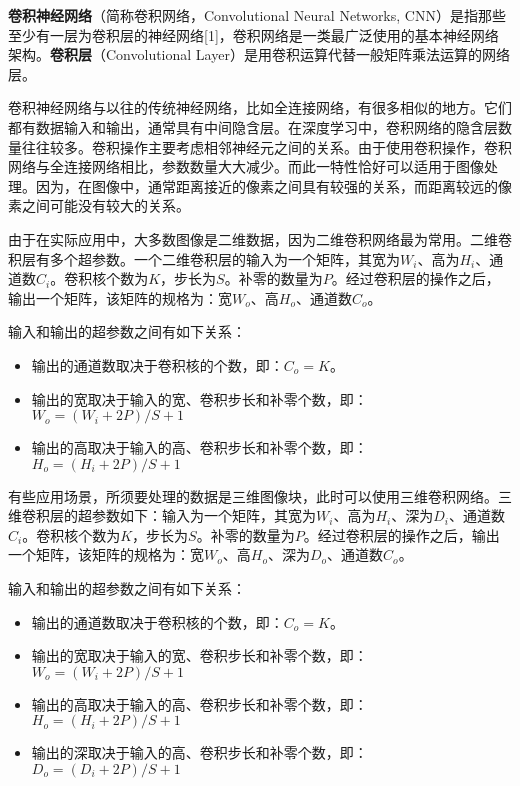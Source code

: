 

\textbf{卷积神经网络}（简称卷积网络，Convolutional Neural Networks, CNN）是指那些至少有一层为卷积层的神经网络[1]，卷积网络是一类最广泛使用的基本神经网络架构。\textbf{卷积层}（Convolutional Layer）是用卷积运算代替一般矩阵乘法运算的网络层。

卷积神经网络与以往的传统神经网络，比如全连接网络，有很多相似的地方。它们都有数据输入和输出，通常具有中间隐含层。在深度学习中，卷积网络的隐含层数量往往较多。卷积操作主要考虑相邻神经元之间的关系。由于使用卷积操作，卷积网络与全连接网络相比，参数数量大大减少。而此一特性恰好可以适用于图像处理。因为，在图像中，通常距离接近的像素之间具有较强的关系，而距离较远的像素之间可能没有较大的关系。

由于在实际应用中，大多数图像是二维数据，因为二维卷积网络最为常用。二维卷积层有多个超参数。一个二维卷积层的输入为一个矩阵，其宽为$W_i$、高为$H_i$、通道数$C_i$。卷积核个数为$K$，步长为$S$。补零的数量为$P$。经过卷积层的操作之后，输出一个矩阵，该矩阵的规格为：宽$W_o$、高$H_o$、通道数$C_o$。

输入和输出的超参数之间有如下关系： \\
\begin{itemize}
\item 输出的通道数取决于卷积核的个数，即：$C_o=K$。
\item 输出的宽取决于输入的宽、卷积步长和补零个数，即：$W_o=(W_i+2P)/S+1$
\item 输出的高取决于输入的高、卷积步长和补零个数，即：$H_o=(H_i+2P)/S+1$
\end{itemize}

有些应用场景，所须要处理的数据是三维图像块，此时可以使用三维卷积网络。三维卷积层的超参数如下：输入为一个矩阵，其宽为$W_i$、高为$H_i$、深为$D_i$、通道数$C_i$。卷积核个数为$K$，步长为$S$。补零的数量为$P$。经过卷积层的操作之后，输出一个矩阵，该矩阵的规格为：宽$W_o$、高$H_o$、深为$D_o$、通道数$C_o$。

输入和输出的超参数之间有如下关系： \\
\begin{itemize}
\item 输出的通道数取决于卷积核的个数，即：$C_o=K$。
\item 输出的宽取决于输入的宽、卷积步长和补零个数，即：$W_o=(W_i+2P)/S+1$
\item 输出的高取决于输入的高、卷积步长和补零个数，即：$H_o=(H_i+2P)/S+1$
\item 输出的深取决于输入的高、卷积步长和补零个数，即：$D_o=(D_i+2P)/S+1$
\end{itemize}

